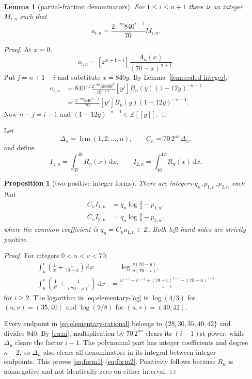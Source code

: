 \documentclass[preprint,12pt]{elsarticle}
\newtheorem{lemma}[theorem]{Lemma}
\newtheorem{proposition}[theorem]{Proposition}
\theoremstyle{definition}
\newcommand{\Z}{\mathbb Z}
\newcommand{\dd}{\,\mathrm d}
\DeclareMathOperator{\lcm}{lcm}
\begin{document}
\begin{lemma}[partial-fraction denominators]\label{lem:ai}
For $1\le i\le n+1$ there is an integer $M_{i,n}$ such that
\begin{equation}\label{eq:ai}
 a_{i,n}=\frac{2^{-an}840^{i-1}}{70}M_{i,n}.
\end{equation}
\end{lemma}

\begin{proof}
At $x=0$,
\[
 a_{i,n}=[x^{n+1-i}]
 \frac{A_n(x)}{(70-x)^{n+1}}.
\]
Put $j=n+1-i$ and substitute $x=840y$.  By
Lemma~\ref{lem:scaled-integer},
\[
\begin{aligned}
 a_{i,n}
 &=840^{-j}\frac{2^{-an}58800^n}{70^{n+1}}
 [y^j]B_n(y)(1-12y)^{-n-1}\\
 &=\frac{2^{-an}840^{n-j}}{70}
 [y^j]B_n(y)(1-12y)^{-n-1}.
\end{aligned}
\]
Now $n-j=i-1$ and $(1-12y)^{-n-1}\in\Z[[y]]$.
\end{proof}

Let
\begin{equation}\label{eq:Cn}
 \Delta_n=\lcm(1,2,\ldots,n),
 \qquad
 C_n=70\,2^{an}\Delta_n,
\end{equation}
and define
\begin{equation}\label{eq:integrals}
 I_{1,n}=\int_{35}^{40}R_n(x)\dd x,
 \qquad
 I_{2,n}=\int_{40}^{42}R_n(x)\dd x.
\end{equation}

\begin{proposition}[two positive integer forms]\label{prop:forms}
There are integers $q_n,p_{1,n},p_{2,n}$ such that
\begin{align}
 C_n I_{1,n}&=q_n\log\frac43-p_{1,n},\label{eq:form1}\\
 C_n I_{2,n}&=q_n\log\frac98-p_{2,n},\label{eq:form2}
\end{align}
where the common coefficient is $q_n=C_n a_{1,n}\in\Z$.  Both left-hand
sides are strictly positive.
\end{proposition}

\begin{proof}
For integers $0<u<v<70$,
\begin{align}
\int_u^v\left(\frac1x+\frac1{70-x}\right)\dd x
 &=\log\frac{v(70-u)}{u(70-v)},\label{eq:elementary-log}\\
\int_u^v\left(\frac1{x^i}+\frac1{(70-x)^i}\right)\dd x
 &=\frac{u^{1-i}-v^{1-i}+(70-v)^{1-i}-(70-u)^{1-i}}{i-1}
 \label{eq:elementary-rational}
\end{align}
for $i\ge2$.  The logarithm in \eqref{eq:elementary-log} is
$\log(4/3)$ for $(u,v)=(35,40)$ and $\log(9/8)$ for
$(u,v)=(40,42)$.

Every endpoint in \eqref{eq:elementary-rational} belongs to
$\{28,30,35,40,42\}$ and divides $840$.  By \eqref{eq:ai},
multiplication by $70\,2^{an}$ clears its $(i-1)$st power, while
$\Delta_n$ clears the factor $i-1$.  The polynomial part has integer
coefficients and degree $n-2$, so $\Delta_n$ also clears all denominators in
its integral between integer endpoints.  This proves
\eqref{eq:form1}--\eqref{eq:form2}.  Positivity follows because $R_n$ is
nonnegative and not identically zero on either interval.
\end{proof}
\end{document}
